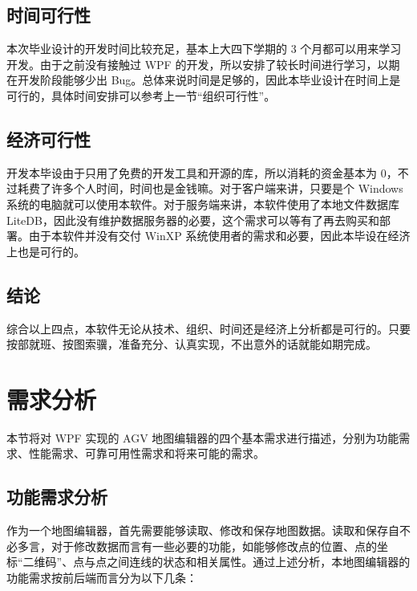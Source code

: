 \subsection{时间可行性}

本次毕业设计的开发时间比较充足，基本上大四下学期的 3 个月都可以用来学习开发。由于之前没有接触过 WPF 的开发，所以安排了较长时间进行学习，以期在开发阶段能够少出 Bug。总体来说时间是足够的，因此本毕业设计在时间上是可行的，具体时间安排可以参考上一节``组织可行性''。

\subsection{经济可行性}

开发本毕设由于只用了免费的开发工具和开源的库，所以消耗的资金基本为 0，不过耗费了许多个人时间，时间也是金钱嘛。对于客户端来讲，只要是个 Windows 系统的电脑就可以使用本软件。对于服务端来讲，本软件使用了本地文件数据库 LiteDB，因此没有维护数据服务器的必要，这个需求可以等有了再去购买和部署。由于本软件并没有交付 WinXP 系统使用者的需求和必要，因此本毕设在经济上也是可行的。

\subsection{结论}

综合以上四点，本软件无论从技术、组织、时间还是经济上分析都是可行的。只要按部就班、按图索骥，准备充分、认真实现，不出意外的话就能如期完成。

\section{需求分析}

本节将对 WPF 实现的 AGV 地图编辑器的四个基本需求进行描述，分别为功能需求、性能需求、可靠可用性需求和将来可能的需求。

\subsection{功能需求分析}

作为一个地图编辑器，首先需要能够读取、修改和保存地图数据。读取和保存自不必多言，对于修改数据而言有一些必要的功能，如能够修改点的位置、点的坐标``二维码''、点与点之间连线的状态和相关属性。通过上述分析，本地图编辑器的功能需求按前后端而言分为以下几条：

